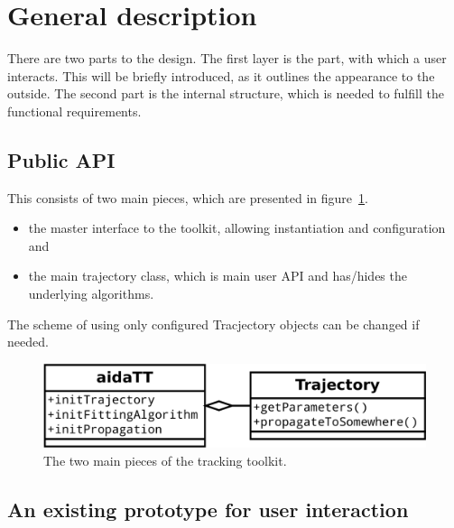 \documentclass[12pt]{article}
\begin{document}
\section{General description}
There are two parts to the design.
The first layer is the part, with which a user interacts.
This will be briefly introduced, as it outlines the appearance to the outside.
The second part is the internal structure, which is needed to fulfill the functional requirements.\\
\subsection{Public API}
This consists of two main pieces, which are presented in figure~\ref{fig:mss}.
\begin{itemize}
    \item the master interface to the toolkit, allowing instantiation and configuration and
    \item the main trajectory class, which is main user API and has/hides the underlying algorithms.
\end{itemize}
The scheme of using only configured Tracjectory objects can be changed if needed.
\begin{figure}[h!]
 \begin{center}
 \includegraphics[width=.66\linewidth]{most_simple_structure.pdf}
 \end{center}
 \caption{The two main pieces of the tracking toolkit.}
 \label{fig:mss}
\end{figure}

 \subsection{An existing prototype for user interaction}
\end{document}

